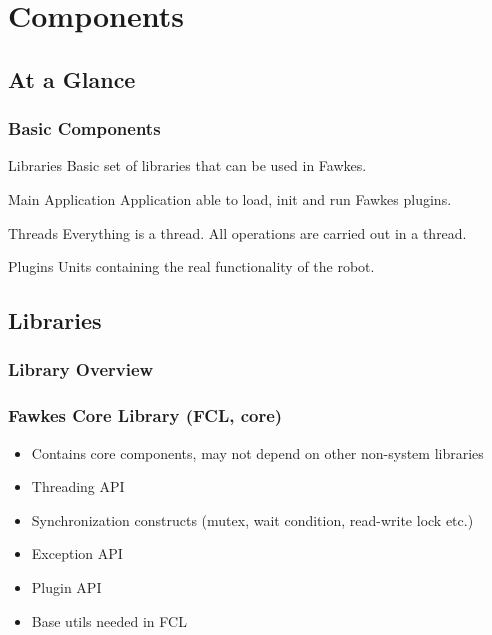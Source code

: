 %
%
%

\section{Components}


\subsection{At a Glance}
\begin{frame}
  \frametitle{Basic Components}
  \begin{block}{Libraries}
    Basic set of libraries that can be used in Fawkes.
  \end{block}
  \begin{block}{Main Application}
    Application able to load, init and run Fawkes plugins.
  \end{block}
  \begin{block}{Threads}
    Everything is a thread. All operations are carried out in a thread.
  \end{block}
  \begin{block}{Plugins}
    Units containing the real functionality of the robot.
  \end{block}
\end{frame}

\subsection{Libraries}
\begin{frame}
  \frametitle{Library Overview}
  \begin{center}
  \end{center}
\end{frame}

\begin{frame}
  \frametitle{Fawkes Core Library (FCL, core)}
  \begin{itemize}
  \item Contains core components, may not depend on other non-system libraries
  \item Threading API
  \item Synchronization constructs (mutex, wait condition, read-write lock etc.)
  \item Exception API
  \item Plugin API
  \item Base utils needed in FCL
  \end{itemize}
\end{frame}

